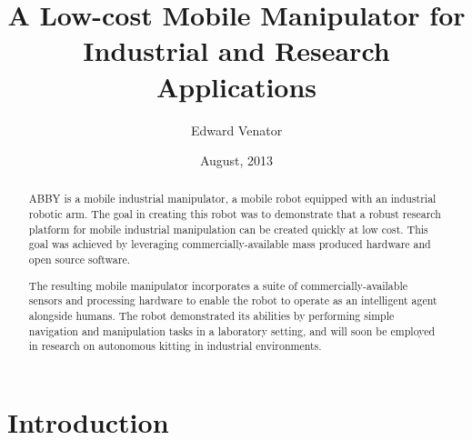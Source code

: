 \documentclass[]{cwru} %
\title{A Low-cost Mobile Manipulator for Industrial and Research Applications}
\author{Edward Venator}
\date{August, 2013} %
\begin{document}



% 

\maketitle
\makeapprovalsheet

\frontmatter
\tableofcontents

\cleardoublepage
{}
{}
\listoftables

\cleardoublepage
{}
{}
\listoffigures




\begin{abstract}
ABBY is a mobile industrial manipulator, a mobile robot equipped with an
industrial robotic arm. The goal in creating this robot was to
demonstrate that a robust research platform for mobile industrial
manipulation can be created quickly at low cost. This goal was achieved
by leveraging commercially-available mass produced hardware and open
source software.

The resulting mobile manipulator incorporates a suite of
commercially-available sensors and processing hardware to enable the
robot to operate as an intelligent agent alongside humans. The robot
demonstrated its abilities by performing simple navigation and
manipulation tasks in a laboratory setting, and will soon be employed in
research on autonomous kitting in industrial environments.
\end{abstract}

\mainmatter
\chapter{Introduction}
\end{document}
